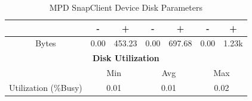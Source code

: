 \documentclass[11pt,a4paper,headinclude=false,footinclude=false]{scrreprt}
\begin{document}
\begin{table}[H]
\begin{tabular}{||c|c|c|c|c|c|c||}
    \hline
      & - & + & - & + & - & + \\
    \hline
    Bytes & 0.00 & 453.23 & 0.00 & 697.68 & 0.00 & 1.23k \\
    \hline\hline
    \multicolumn{7}{|c|}{\textbf{Disk Utilization}} \\
    \hline\hline
      & \multicolumn{2}{|c|}{Min} & \multicolumn{2}{|c|}{Avg} & \multicolumn{2}{|c|}{Max} \\
    \hline
    Utilization (\%Busy)  & \multicolumn{2}{|c|}{0.01} & \multicolumn{2}{|c|}{0.01} & \multicolumn{2}{|c|}{0.02} \\
    \hline\hline
    \end{tabular}
    \caption{MPD SnapClient Device Disk Parameters}
    \label{MPDclientDiskTab}
\end{table}
\end{document}
